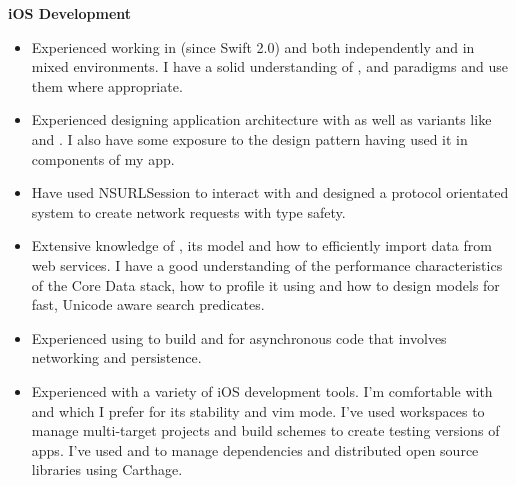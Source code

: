 \textbf{iOS Development}
\begin{itemize}[leftmargin=0mm]
\item Experienced working in  (since Swift 2.0) and
   both independently and in mixed environments. I have a
  solid understanding of , 
  and  paradigms and use them where appropriate.
\item Experienced designing application architecture with  as well as
  variants like  and . I also have some exposure to
  the  design pattern having used it in components of my app.
\item Have used NSURLSession to interact with  and
  designed a protocol orientated system to create network requests with type
  safety.
\item Extensive knowledge of , its  model
  and how to efficiently import data from web services. I have a good
  understanding of the performance characteristics of the Core Data stack, how
  to profile it using  and how to design models for fast,
  Unicode aware search predicates.
\item Experienced using  to build  and
   for asynchronous code that involves networking and
  persistence.
\item Experienced with a variety of iOS development tools. I'm comfortable with
   and  which I prefer for its stability and vim
  mode. I've used workspaces to manage multi-target projects and build schemes
  to create testing versions of apps. I've used  and
   to manage dependencies and distributed open source libraries
  using Carthage.
\end{itemize}

